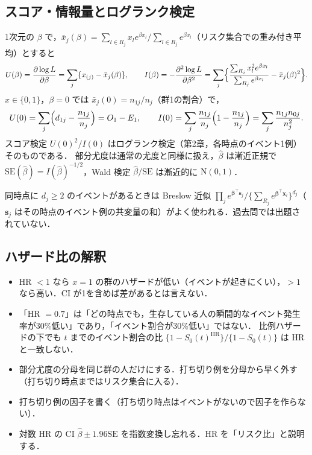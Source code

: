 \documentclass[a4paper,11pt,openany]{ltjsbook}
\newcommand{\SE}{\mathrm{SE}}
\newcommand{\HR}{\mathrm{HR}}
\newcommand{\Normal}{\mathrm{N}}
\newcommand{\transp}{^{\top}}
\begin{document}
\subsection{スコア・情報量とログランク検定}
1次元の $\beta$ で，$\bar x_j(\beta)=\sum_{l\in R_j}x_le^{\beta x_l}\big/\sum_{l\in R_j}e^{\beta x_l}$（リスク集合での重み付き平均）とすると
\[
U(\beta)=\frac{\partial\log L}{\partial\beta}=\sum_j\{x_{(j)}-\bar x_j(\beta)\},\qquad
I(\beta)=-\frac{\partial^2\log L}{\partial\beta^2}=\sum_j\Bigl\{\frac{\sum_{R_j}x_l^2e^{\beta x_l}}{\sum_{R_j}e^{\beta x_l}}-\bar x_j(\beta)^2\Bigr\}.
\]
$x\in\{0,1\}$，$\beta=0$ では $\bar x_j(0)=n_{1j}/n_j$（群1の割合）で，
\[
U(0)=\sum_j\Bigl(d_{1j}-\frac{n_{1j}}{n_j}\Bigr)=O_1-E_1,\qquad
I(0)=\sum_j\frac{n_{1j}}{n_j}\Bigl(1-\frac{n_{1j}}{n_j}\Bigr)=\sum_j\frac{n_{1j}n_{0j}}{n_j^2}.
\]
スコア検定 $U(0)^2/I(0)$ はログランク検定（第2章，各時点のイベント1例）そのものである．
部分尤度は通常の尤度と同様に扱え，$\hat\beta$ は漸近正規で $\SE(\hat\beta)=I(\hat\beta)^{-1/2}$，Wald 検定 $\hat\beta/\SE$ は漸近的に $\Normal(0,1)$．
\begin{supbox}[補足：同時点のイベント]
同時点に $d_j\ge2$ のイベントがあるときは Breslow 近似 $\prod_j e^{\bm\beta\transp\bm s_j}/\{\sum_{R_j}e^{\bm\beta\transp\bm x_l}\}^{d_j}$（$\bm s_j$ はその時点のイベント例の共変量の和）がよく使われる．過去問では出題されていない．
\end{supbox}

\subsection{ハザード比の解釈}
\begin{itemize}
\item HR $<1$ なら $x=1$ の群のハザードが低い（イベントが起きにくい），$>1$ なら高い．CI が1を含めば差があるとは言えない．
\item 「HR $=0.7$」は「どの時点でも，生存している人の瞬間的なイベント発生率が30\%低い」であり，「イベント割合が30\%低い」ではない．
      比例ハザードの下でも $t$ までのイベント割合の比 $\{1-S_0(t)^{\HR}\}/\{1-S_0(t)\}$ は HR と一致しない．
\end{itemize}

\begin{warnbox}
\begin{itemize}
\item 部分尤度の分母を同じ群の人だけにする．打ち切り例を分母から早く外す（打ち切り時点まではリスク集合に入る）．
\item 打ち切り例の因子を書く（打ち切り時点はイベントがないので因子を作らない）．
\item 対数 HR の CI $\hat\beta\pm1.96\SE$ を指数変換し忘れる．HR を「リスク比」と説明する．
\end{itemize}
\end{warnbox}
\end{document}
